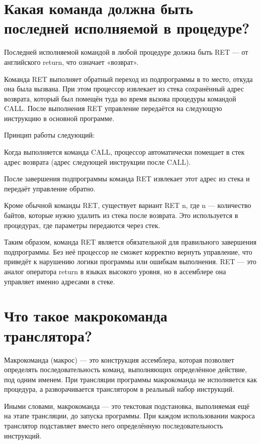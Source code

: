 \section{Какая команда должна быть последней исполняемой в процедуре?}

Последней исполняемой командой в любой процедуре должна быть RET — от английского return, что означает «возврат».

Команда RET выполняет обратный переход из подпрограммы в то место, откуда она была вызвана. При этом процессор извлекает из стека сохранённый адрес возврата, который был помещён туда во время вызова процедуры командой CALL. После выполнения RET управление передаётся на следующую инструкцию в основной программе.

Принцип работы следующий:

Когда выполняется команда CALL, процессор автоматически помещает в стек адрес возврата (адрес следующей инструкции после CALL).

После завершения подпрограммы команда RET извлекает этот адрес из стека и передаёт управление обратно.

Кроме обычной команды RET, существует вариант RET n, где n — количество байтов, которые нужно удалить из стека после возврата. Это используется в процедурах, где параметры передаются через стек.

Таким образом, команда RET является обязательной для правильного завершения подпрограммы. Без неё процессор не сможет корректно вернуть управление, что приведёт к нарушению логики программы или ошибкам выполнения. RET — это аналог оператора return в языках высокого уровня, но в ассемблере она управляет именно адресами в стеке.

\section{Что такое макрокоманда транслятора?}

Макрокоманда (макрос) — это конструкция ассемблера, которая позволяет определять последовательность команд, выполняющих определённое действие, под одним именем. При трансляции программы макрокоманда не исполняется как процедура, а разворачивается транслятором в реальный набор инструкций.

Иными словами, макрокоманда — это текстовая подстановка, выполняемая ещё на этапе трансляции, до запуска программы. При каждом использовании макроса транслятор подставляет вместо него определённую последовательность инструкций.

